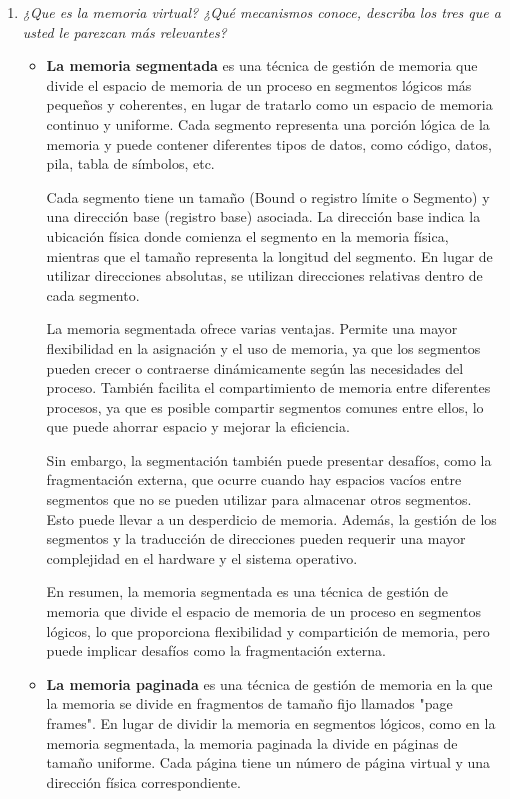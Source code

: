 \documentclass[../main.tex]{subfiles}
\begin{document}
        \begin{enumerate}
            \item 
                \textit{¿Que es la memoria virtual? ¿Qué mecanismos conoce, describa los tres que a usted le parezcan más relevantes?}\\
                
                \begin{itemize}
                    \item 
                        \textbf{La memoria segmentada} es una técnica de gestión de memoria que divide el espacio de memoria de un proceso en segmentos lógicos más pequeños y coherentes, en lugar de tratarlo como un espacio de memoria continuo y uniforme. Cada segmento representa una porción lógica de la memoria y puede contener diferentes tipos de datos, como código, datos, pila, tabla de símbolos, etc.

                        Cada segmento tiene un tamaño (Bound o registro límite o Segmento) y una dirección base (registro base) asociada. La dirección base indica la ubicación física donde comienza el segmento en la memoria física, mientras que el tamaño representa la longitud del segmento. En lugar de utilizar direcciones absolutas, se utilizan direcciones relativas dentro de cada segmento.
                        
                        La memoria segmentada ofrece varias ventajas. Permite una mayor flexibilidad en la asignación y el uso de memoria, ya que los segmentos pueden crecer o contraerse dinámicamente según las necesidades del proceso. También facilita el compartimiento de memoria entre diferentes procesos, ya que es posible compartir segmentos comunes entre ellos, lo que puede ahorrar espacio y mejorar la eficiencia.
                        
                        Sin embargo, la segmentación también puede presentar desafíos, como la fragmentación externa, que ocurre cuando hay espacios vacíos entre segmentos que no se pueden utilizar para almacenar otros segmentos. Esto puede llevar a un desperdicio de memoria. Además, la gestión de los segmentos y la traducción de direcciones pueden requerir una mayor complejidad en el hardware y el sistema operativo.
                        
                        En resumen, la memoria segmentada es una técnica de gestión de memoria que divide el espacio de memoria de un proceso en segmentos lógicos, lo que proporciona flexibilidad y compartición de memoria, pero puede implicar desafíos como la fragmentación externa.
                    \item 
                        \textbf{La memoria paginada} es una técnica de gestión de memoria en la que la memoria se divide en fragmentos de tamaño fijo llamados "page frames". En lugar de dividir la memoria en segmentos lógicos, como en la memoria segmentada, la memoria paginada la divide en páginas de tamaño uniforme. Cada página tiene un número de página virtual y una dirección física correspondiente.


\end{itemize}
\end{enumerate}
\end{document}
